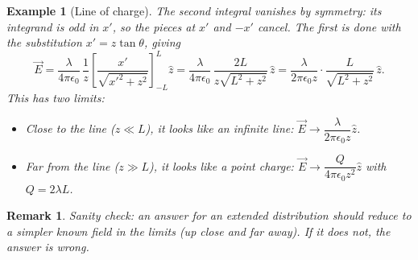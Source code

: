\documentclass{article}
\newtheorem*{example}{Example}
\newtheorem{remark}{Remark}
\begin{document}
\begin{example}[Line of charge]
    The second integral vanishes by symmetry: its integrand is odd in $x'$, so the pieces at $x'$ and $-x'$ cancel. The first is done with the substitution $x' = z\tan\theta$, giving
    \[\vec{E} = \frac{\lambda}{4\pi\epsilon_0}\,\frac{1}{z}\left[\frac{x'}{\sqrt{x'^2+z^2}}\right]_{-L}^{L}\hat{z} = \frac{\lambda}{4\pi\epsilon_0}\,\frac{2L}{z\sqrt{L^2+z^2}}\,\hat{z} = \frac{\lambda}{2\pi\epsilon_0 z}\cdot\frac{L}{\sqrt{L^2 + z^2}}\,\hat{z}.\]
    This has two limits:
    \begin{itemize}
        \item Close to the line ($z \ll L$), it looks like an infinite line: $\vec{E} \to \dfrac{\lambda}{2\pi\epsilon_0 z}\hat{z}$.
        \item Far from the line ($z \gg L$), it looks like a point charge: $\vec{E} \to \dfrac{Q}{4\pi\epsilon_0 z^2}\hat{z}$ with $Q = 2\lambda L$.
    \end{itemize}
\end{example}
\begin{remark}
    Sanity check: an answer for an extended distribution should reduce to a simpler known field in the limits (up close and far away). If it does not, the answer is wrong.
\end{remark}
\end{document}
